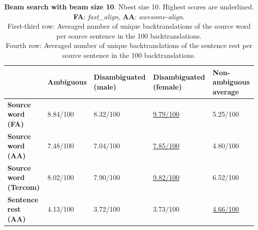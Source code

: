 \begin{table}[!htb]

    \begin{subtable}{\textwidth}
        \centering
        \begin{tabularx}{\linewidth}{|X|XXXX|}
            \hline
             & \textbf{Ambiguous} & \textbf{Disambiguated (male)} & \textbf{Disambiguated (female)} & \textbf{Non-ambiguous average} \\ \hline
             \textbf{Source word (FA)} & 8.84/100 & 8.32/100 & \underline{9.79/100} & 5.25/100 \\ 
             \textbf{Source word (AA)} & 7.48/100 & 7.04/100 & \underline{7.85/100} & 4.80/100 \\ 
             \textbf{Source word (Tercom)} & 8.02/100 & 7.90/100 & \underline{9.82/100} & 6.52/100 \\ \hline
             \textbf{Sentence rest (AA)} & 4.13/100 & 3.72/100 & 3.73/100 & \underline{4.66/100} \\ \hline
        \end{tabularx}
        \caption{\textbf{Beam search with beam size 10}. Nbest size 10. Highest scores are underlined. \\ \textbf{FA}: \textit{fast\_align}, \textbf{AA}: \textit{awesome-align}. \\ First-third row: Averaged number of unique backtranslations of the source word per source sentence in the 100 backtranslations. \\ Fourth row: Averaged number of unique backtranslations of the sentence rest per source sentence in the 100 backtranslations.}
        \label{tab:alignment_backtranslation_10}
    \end{subtable}


\end{table}
